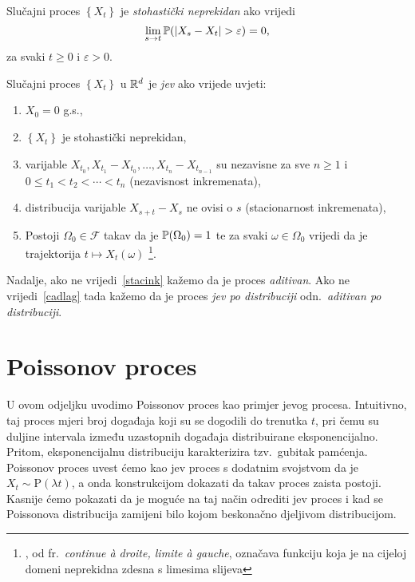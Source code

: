 \documentclass[main.tex]{subfiles}
\begin{document}
\begin{definicija}
	Slučajni proces \( \left\{ X_t \right\} \) je \emph{stohastički neprekidan} ako vrijedi
	\begin{equation} \label{def:stohnep}
		\lim\limits_{s \rightarrow t} \P (\abs{X_s - X_t} > \varepsilon)  = 0,
	\end{equation}
	za svaki \( t \ge 0 \) i \( \varepsilon > 0 \).
\end{definicija}

\begin{definicija}
	Slučajni proces \( \left\{ X_t \right\} \) u \( \R^d \) je \emph{\levy jev} ako vrijede uvjeti:
	\begin{enumerate}[label=(\roman*)]
		\item \( X_0 = 0 \) g.s.,
		\item \( \left\{ X_t \right\} \) je stohastički neprekidan,
		\item varijable \( X_{t_0}, X_{t_1}-X_{t_0}, \ldots ,X_{t_n}-X_{t_{n-1}} \) su nezavisne za sve \( n \ge 1 \) i \(0 \le t_1 < t_2 < \cdots < t_n \) (nezavisnost inkremenata),
		\item distribucija varijable \( X_{s+t}-X_s \) ne ovisi o \( s \) (stacionarnost inkremenata), \label{stacink}
		\item Postoji \( \Omega_0 \in \mathcal F \) takav da je \( \P(\Omega_0) = 1 \) te za svaki \( \omega \in \Omega_0 \) vrijedi da je trajektorija
		      \( t \mapsto X_t(\omega) \) \cadlag\footnote{\cadlag, od fr.\ \textit{continue à droite, limite à gauche}, označava funkciju koja je na cijeloj domeni neprekidna zdesna s limesima slijeva}. \label{cadlag}
	\end{enumerate}
	Nadalje, ako ne vrijedi~\ref{stacink} kažemo da je proces \emph{aditivan}. Ako ne vrijedi~\ref{cadlag} tada kažemo da je proces \emph{\levy jev po distribuciji} odn.\
	\emph{aditivan po distribuciji}.
\end{definicija}

\section{Poissonov proces}\label{sec:sp-poisson}
U ovom odjeljku uvodimo Poissonov proces kao primjer \levy jevog procesa. Intuitivno, taj proces mjeri broj događaja koji su se dogodili do
trenutka \( t \), pri čemu su duljine intervala između uzastopnih događaja distribuirane eksponencijalno. Pritom, eksponencijalnu distribuciju karakterizira
tzv.\ gubitak pamćenja. Poissonov proces uvest ćemo kao \levy jev proces s dodatnim svojstvom da je \( X_t \sim \mathrm P(\lambda t) \), a onda konstrukcijom
dokazati da takav proces zaista postoji. Kasnije ćemo pokazati da je moguće na taj način odrediti \levy jev proces i kad se Poissonova distribucija zamijeni
bilo kojom beskonačno djeljivom distribucijom.
\end{document}

